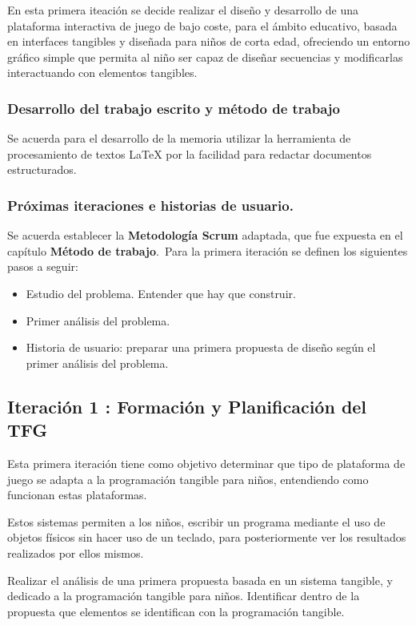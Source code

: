 En esta primera iteación se decide realizar el diseño y desarrollo de una plataforma interactiva de juego de bajo coste, para el ámbito educativo, basada en interfaces tangibles y diseñada para niños de corta edad, ofreciendo un entorno gráfico simple que permita al niño ser capaz de diseñar secuencias y modificarlas interactuando con elementos tangibles.\

\subsubsection{Desarrollo del trabajo escrito y método de trabajo}
Se acuerda para el desarrollo de la memoria utilizar la herramienta de procesamiento de textos \LaTeX{} por la facilidad para redactar documentos estructurados.



\subsubsection{Próximas iteraciones e historias de usuario.}
Se acuerda establecer la \textbf{Metodología Scrum} adaptada, que fue expuesta en el capítulo \textbf{Método de trabajo}.\
Para la primera iteración se definen los siguientes pasos a seguir:
\begin{itemize}
\item Estudio del problema. Entender que hay que construir.
\item Primer análisis del problema.
\item Historia de usuario: preparar una primera propuesta de diseño según el primer análisis del problema.
\end{itemize}

\subsection{Iteración 1 : Formación y Planificación del TFG }

Esta primera iteración tiene como objetivo determinar que tipo de plataforma de juego se adapta a la programación tangible para niños, entendiendo como funcionan estas plataformas.

Estos sistemas permiten a los niños, escribir un programa mediante el uso de objetos físicos sin hacer uso de un teclado, para posteriormente ver los resultados realizados por ellos mismos.

Realizar el análisis de una primera propuesta basada en un sistema tangible, y dedicado a la programación tangible para niños. Identificar dentro de la propuesta que elementos se identifican con la programación tangible.


